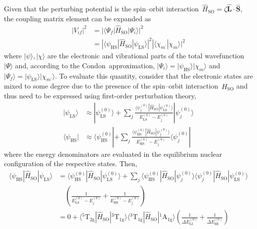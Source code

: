 Given that the perturbing potential is
the spin--orbit interaction~$\hat{H}_\text{SO} = \zeta \hat{\boldsymbol{L}} \cdot \hat{\boldsymbol{S}}$,
the coupling matrix element can be expanded as
%
\begin{equation}
  \begin{aligned}
    |V_{i f}|^2 & = |\langle \Psi_f | \hat{H}_\text{SO} | \Psi_i \rangle|^2 \\
      & = |\langle \psi_\text{HS} | \hat{H}_\text{SO} | \psi_\text{LS} \rangle|^2
      | \langle \chi_{m^\prime} | \chi_m \rangle |^2
  \end{aligned}
\end{equation}
%
where $| \psi \rangle, | \chi \rangle $ are the electronic and vibrational parts
of the total wavefunction~$| \Psi \rangle$ and,
according to the Condon~approximation, $| \Psi_i \rangle = | \psi_\text{HS} \rangle | \chi_m \rangle$
and $| \Psi_f \rangle = | \psi_\text{LS} \rangle | \chi_{m^\prime} \rangle$.
%
To evaluate this quantity, consider that
the electronic states are mixed to some degree
due to the presence of the spin--orbit interaction~$\hat{H}_\text{SO}$
and thus need to be expressed using first-order perturbation theory,
%
\begin{equation}
  \begin{aligned}
    | \psi_\text{LS} \rangle
      & \approx | \psi_\text{LS}^{(0)} \rangle
        + \sum_{j}
          \frac{\langle \psi_j^{(0)} | \hat{H}_\text{SO} | \psi_\text{LS}^{(0)} \rangle}{E_\text{LS}^{(0)} - E_j^{(0)}} | \psi_j^{(0)} \rangle \\
    \langle \psi_\text{HS} |
      & \approx \langle \psi_\text{HS}^{(0)} |
        + \sum_{j}
          \frac{\langle \psi_\text{HS}^{(0)} | \hat{H}_\text{SO} | \psi_j^{(0)} \rangle}{E_\text{HS}^{(0)} - E_j^{(0)}} \langle \psi_j^{(0)} |
  \end{aligned}
\end{equation}
%
where the energy denominators are evaluated in
the equilibrium nuclear configuration of the respective states.
Then,
%
\begin{equation}
  \begin{aligned}
    \langle \psi_\text{HS} | \hat{H}_\text{SO} | \psi_\text{LS} \rangle
      & = \langle \psi_\text{HS}^{(0)} | \hat{H}_\text{SO} | \psi_\text{LS}^{(0)} \rangle
        + \sum_{j} \langle \psi_\text{HS}^{(0)} | \hat{H}_\text{SO} | \psi_j^{(0)} \rangle
        \langle \psi_j^{(0)} | \hat{H}_\text{SO} | \psi_\text{LS}^{(0)} \rangle \\
      & \quad \left( \frac{1}{E_\text{LS}^{(0)} - E_j^{(0)}} + \frac{1}{E_\text{HS}^{(0)} - E_j^{(0)}} \right) \\
      & = 0 + \langle \mathrm{^5T_{2g}} | \hat{H}_\text{SO} | \mathrm{^3T_{1g}} \rangle
        \langle \mathrm{^3T_{1g}} | \hat{H}_\text{SO} | \mathrm{^1A_{1g}} \rangle
        \left( \frac{1}{\Delta E_\text{LI}^{(0)}} + \frac{1}{\Delta E_\text{HI}^{(0)}} \right)
  \end{aligned}
\end{equation}
